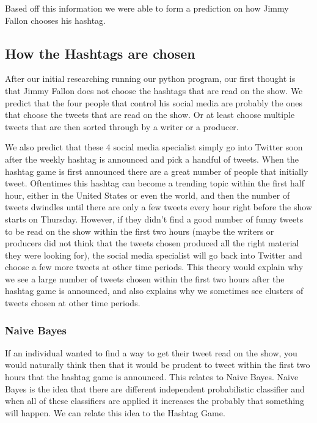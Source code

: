 \documentclass[titlepage]{article}
\begin{document}
Based off this information we were able to form a prediction on how Jimmy Fallon chooses his hashtag.



\subsection{How the Hashtags are chosen}

After our initial researching running our python program, our first thought is that Jimmy Fallon does not choose the hashtags that are read on the show. We predict that the four people that control his social media are probably the ones that choose the tweets that are read on the show. Or at least choose multiple tweets that are then sorted through by a writer or a producer. 

We also predict that these 4 social media specialist simply go into Twitter soon after the weekly hashtag is announced and pick a handful of tweets. When the hashtag game is first announced there are a great number of people that initially tweet. Oftentimes this hashtag can become a trending topic within the first half hour, either in the United States or even the world, and then the number of tweets dwindles until there are only a few tweets every hour right before the show starts on Thursday. However, if they didn't find a good number of funny tweets to be read on the show within the first two hours (maybe the writers or producers did not think that the tweets chosen produced all the right material they were looking for), the social media specialist will go back into Twitter and choose a few more tweets at other time periods. This theory would explain why we see a large number of tweets chosen within the first two hours after the hashtag game is announced, and also explains why we sometimes see clusters of tweets chosen at other time periods.

\subsubsection{Naive Bayes}

If an individual wanted to find a way to get their tweet read on the show, you would naturally think then that it would be prudent to tweet within the first two hours that the hashtag game is announced. This relates to Naive Bayes. Naive Bayes is the idea that there are different independent probabilistic classifier and when all of these classifiers are applied it increases the probably that something will happen. We can relate this idea to the Hashtag Game. 
\end{document}
